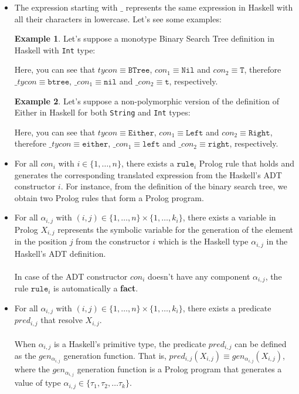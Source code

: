\documentclass{report}
\theoremstyle{definition}
\newtheorem{example}{Example}[section]
\theoremstyle{definition}
\newcommand{\ttt}[1]{\texttt{#1}}
\begin{document}
\begin{itemize}
	\item The expression starting with $\_$ represents the same expression in Haskell with all their characters in lowercase. Let's see some examples:
	      	      	      	      	      	      
	      \begin{example}
	      	Let's suppose a monotype Binary Search Tree definition in Haskell with \ttt{Int} type:
	      	
	      	Here, you can see that $tycon \equiv \ttt{BTree}$, $con_1 \equiv \ttt{Nil}$ and $con_2 \equiv \ttt{T}$, therefore $\_tycon \equiv \ttt{btree}$, $\_con_1 \equiv \ttt{nil}$ and $\_con_2 \equiv \ttt{t}$, respectively.
	      \end{example}
	      \begin{example}
	      	Let's suppose a non-polymorphic version of the definition of Either in Haskell for both \ttt{String} and \ttt{Int} types:
	      	
	      	Here, you can see that $tycon \equiv \ttt{Either}$, $con_1 \equiv \ttt{Left}$ and $con_2 \equiv \ttt{Right}$, therefore $\_tycon \equiv \ttt{either}$, $\_con_1 \equiv \ttt{left}$ and $\_con_2 \equiv \ttt{right}$, respectively.
	      \end{example}
	      	      	      	      	      
	\item For all $con_i$ with $i \in \{1, \ldots, n \}$, there exists a $\ttt{rule}_i$ Prolog rule that holds and generates the corresponding translated expression from the Haskell's ADT constructor $i$. For instance, from the definition of the binary search tree, we obtain two Prolog rules that form a Prolog program.
	\item For all $\alpha_{i,j}$ with $(i,j) \in \{1, \ldots, n \} \times \{1, \ldots, k_i \}$, there exists a variable in Prolog $X_{i,j}$ represents the symbolic variable for the generation of the element in the position $j$ from the constructor $i$ which is the Haskell type $\alpha_{i,j}$ in the Haskell's ADT definition.\\\\
	      In case of the ADT constructor $con_i$ doesn't have any component $\alpha_{i,j}$, the rule $\ttt{rule}_i$ is automatically a \textbf{fact}.
	      	      	      	      
	\item For all $\alpha_{i,j}$ with $(i,j) \in \{1, \ldots, n \} \times \{1, \ldots, k_i \}$, there exists a predicate $pred_{i,j}$ that resolve $X_{i,j}$.\\\\
	      When $\alpha_{i,j}$ is a Haskell's primitive type, the predicate $pred_{i,j}$ can be defined as the $gen_{\alpha_{i,j}}$ generation function. That is, $pred_{i,j}(X_{i,j}) \equiv gen_{\alpha_{i,j}}(X_{i,j})$, where the $gen_{\alpha_{i,j}}$ generation function is a Prolog program that generates a value of type $\alpha_{i,j} \in \{ \tau_1, \tau_2, \ldots \tau_k \}$.
	      	      	      	      
\end{itemize}
\end{document}
